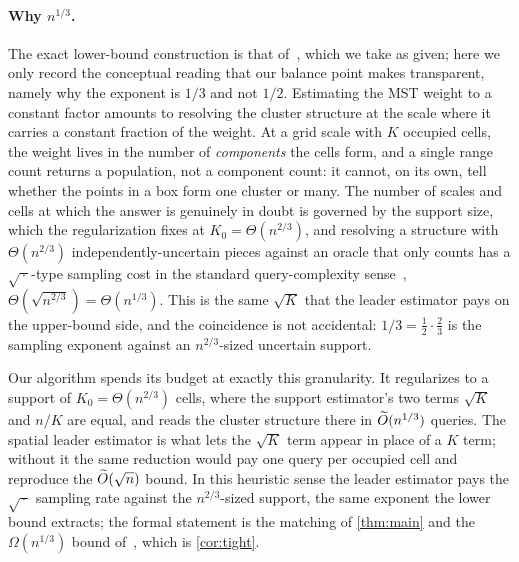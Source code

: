 \paragraph{Why $n^{1/3}$.}
The exact lower-bound construction is that of~\cite{DMOSW25}, which we take as given; here we only record
the conceptual reading that our balance point makes transparent, namely why the exponent is $1/3$ and not
$1/2$. Estimating the MST weight to a constant factor amounts to resolving the cluster structure at the
scale where it carries a constant fraction of the weight. At a grid scale with $K$ occupied cells, the
weight lives in the number of \emph{components} the cells form, and a single range count returns a
population, not a component count: it cannot, on its own, tell whether the points in a box form one
cluster or many. The number of scales and cells at which the answer is genuinely in doubt is governed by
the support size, which the regularization fixes at $K_0=\Theta(n^{2/3})$, and resolving a structure with
$\Theta(n^{2/3})$ independently-uncertain pieces against an oracle that only counts has a
$\sqrt{\,\cdot\,}$-type sampling cost in the standard query-complexity sense~\cite{AroraBarak09},
$\Theta(\sqrt{n^{2/3}})=\Theta(n^{1/3})$. This is the same $\sqrt K$
that the leader estimator pays on the upper-bound side, and the coincidence is not accidental: $1/3=\tfrac12
\cdot\tfrac23$ is the sampling exponent against an $n^{2/3}$-sized uncertain support.

Our algorithm spends its budget at exactly this granularity. It regularizes to a support of
$K_0=\Theta(n^{2/3})$ cells, where the support estimator's two terms $\sqrt K$ and $n/K$ are equal, and
reads the cluster structure there in $\widetilde{O}(n^{1/3})$ queries. The spatial leader estimator is what lets
the $\sqrt K$ term appear in place of a $K$ term; without it the same reduction would pay one query per
occupied cell and reproduce the $\widetilde{O}(\sqrt n)$ bound. In this heuristic sense the leader estimator pays
the $\sqrt{\,\cdot\,}$ sampling rate against the $n^{2/3}$-sized support, the same exponent the lower bound
extracts; the formal statement is the matching of \cref{thm:main} and the $\Omega(n^{1/3})$ bound
of~\cite{DMOSW25}, which is \cref{cor:tight}.
